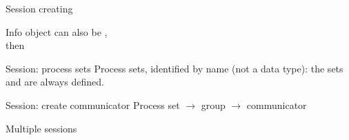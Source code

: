 \begin{numberedframe}{Session creating}

  Info object can also be , \\
  then
\end{numberedframe}

\begin{numberedframe}{Session: process sets}
  Process sets, identified by name (not a data type):
  the sets  and  are always defined.
\end{numberedframe}

\begin{numberedframe}{Session: create communicator}
  Process set $\rightarrow$ group $\rightarrow$ communicator
\end{numberedframe}

\begin{numberedframe}{Multiple sessions}
\end{numberedframe}

\endinput

\begin{numberedframe}{}
\begin{lstlisting}
\end{lstlisting}
\end{numberedframe}

\begin{numberedframe}{}
\begin{lstlisting}
\end{lstlisting}
\end{numberedframe}

\begin{numberedframe}{}
\begin{lstlisting}
\end{lstlisting}
\end{numberedframe}

\begin{numberedframe}{}
\begin{lstlisting}
\end{lstlisting}
\end{numberedframe}

\endinput

\begin{numberedframe}{}
\begin{lstlisting}
\end{lstlisting}
\end{numberedframe}

